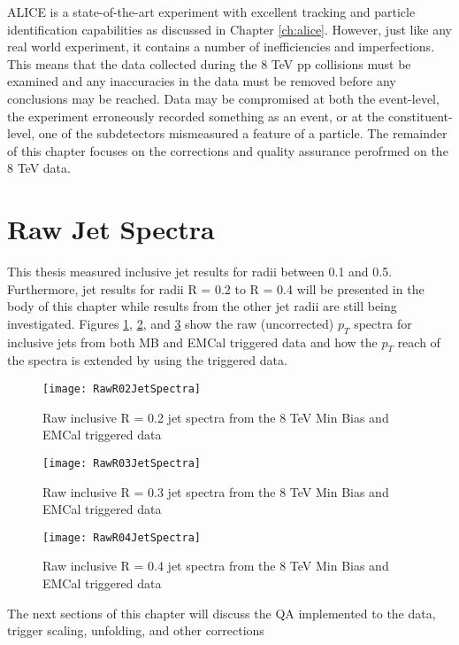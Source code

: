 \noindent

ALICE is a state-of-the-art experiment with excellent tracking and particle identification capabilities as discussed in Chapter \ref{ch:alice}.  However, just like any real world experiment, it contains a number of inefficiencies and imperfections.  This means that the data collected during the 8 TeV pp collisions must be examined and any inaccuracies in the data must be removed before any conclusions may be reached.  Data may be compromised at both the event-level, the experiment erroneously recorded something as an event, or at the constituent-level, one of the subdetectors mismeasured a feature of a particle.  The remainder of this chapter focuses on the corrections and quality assurance perofrmed on the 8 TeV data.


\section{Raw Jet Spectra}

This thesis measured inclusive jet results for radii between 0.1 and 0.5.  Furthermore, jet results for radii R = 0.2 to R = 0.4 will be presented in the body of this chapter while results from the other jet radii are still being investigated.  Figures \ref{fig:rawjetR02}, \ref{fig:rawjetR03}, and \ref{fig:rawjetR04} show the raw (uncorrected) $p_{T}$ spectra for inclusive jets from both MB and EMCal triggered data and how the $p_{T}$ reach of the spectra is extended by using the triggered data.

\begin{figure}[h]
\texttt{[image: RawR02JetSpectra]}
\centering
\caption{Raw inclusive R = 0.2 jet spectra from the 8 TeV Min Bias and EMCal triggered data}
\label{fig:rawjetR02}
\end{figure}
\begin{figure}[h]
\texttt{[image: RawR03JetSpectra]}
\centering
\caption{Raw inclusive R = 0.3 jet spectra from the 8 TeV Min Bias and EMCal triggered data}
\label{fig:rawjetR03}
\end{figure}
\begin{figure}[h]
\texttt{[image: RawR04JetSpectra]}
\centering
\caption{Raw inclusive R = 0.4 jet spectra from the 8 TeV Min Bias and EMCal triggered data}
\label{fig:rawjetR04}
\end{figure}

\noindent
The next sections of this chapter will discuss the QA implemented to the data, trigger scaling, unfolding, and other corrections 


